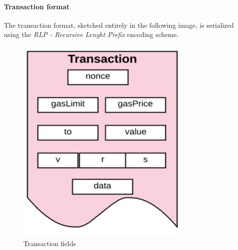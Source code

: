 \documentclass[10pt,a4paper]{report}
\begin{document}
\paragraph{Transaction format}\label{sec:transaction-format}
The transaction format, sketched entirely in the following image, is serialized using the \textit{RLP - Recursive Lenght Prefix} encoding scheme.
\begin{figure}
	\centering
	\includegraphics[scale=0.50]{images/Pasted image 20230417125024.png}
	\caption{Transaction fields}
\end{figure}
\end{document}
